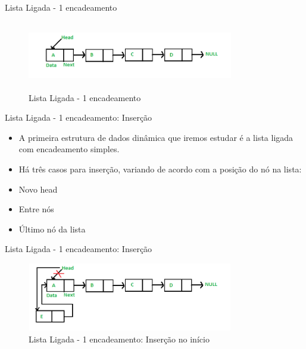 \begin{frame}
	\begin{block}{Lista Ligada - 1 encadeamento}
		\begin{figure}[!htb]
			\centering	  				
			\includegraphics[height=3cm, width = 9cm]{./pic/LinkedlistUmEncadeamento.png}
			\caption{Lista Ligada - 1 encadeamento \cite{GEEKS_2018}}
			\label{fig_LLS_one}
		\end{figure}
	\end{block}
\end{frame}

\begin{frame}
	\begin{block}{Lista Ligada - 1 encadeamento: Inserção}
	\begin{itemize}
			\item A primeira estrutura de dados dinâmica que iremos estudar é a lista ligada com encadeamento simples.
	
			\item Há três casos para inserção, variando de acordo com a posição do nó na lista: 
			
			\item Novo head 
			
			\item Entre nós
			
			\item Último nó da lista
		\end{itemize}
	\end{block}
\end{frame}

\begin{frame}
	\begin{block}{Lista Ligada - 1 encadeamento: Inserção}
		\begin{figure}[!htb]
			\centering	  				
			\includegraphics[height=3cm, width = 9cm]{./pic/Linkedlist_insert_at_start.png}
			\caption{Lista Ligada - 1 encadeamento: Inserção no início \cite{GEEKS_2018}}
			\label{fig_LLS_two}
		\end{figure}
	\end{block}
\end{frame}

